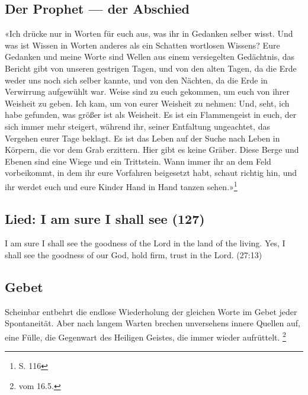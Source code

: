 \subsection{Der Prophet — der Abschied}
«Ich drücke nur in Worten für euch aus, was ihr in Gedanken selber wisst. Und was ist Wissen in Worten anderes als ein Schatten wortlosen Wissens? Eure Gedanken und meine Worte sind Wellen aus einem versiegelten Gedächtnis, das Bericht gibt von unseren gestrigen Tagen, und von den alten Tagen, da die Erde weder uns noch sich selber kannte, und von den Nächten, da die Erde in Verwirrung aufgewühlt war. Weise sind zu euch gekommen, um euch von ihrer Weisheit zu geben. Ich kam, um von eurer Weisheit zu nehmen: Und, seht, ich habe gefunden, was größer ist als Weisheit. Es ist ein Flammengeist in euch, der sich immer mehr steigert, während ihr, seiner Entfaltung ungeachtet, das Vergehen eurer Tage beklagt. Es ist das Leben auf der Suche nach Leben in Körpern, die vor dem Grab erzittern.
Hier gibt es keine Gräber. Diese Berge und Ebenen sind eine Wiege und ein Trittstein. Wann immer ihr an dem Feld vorbeikommt, in dem ihr eure Vorfahren beigesetzt habt, schaut richtig hin, und ihr werdet euch und eure Kinder Hand in Hand tanzen sehen.»\footnote{\cite{prophet}S. 116}

\subsection{Lied: I am sure I shall see (127)}
I am sure I shall see the goodness of the Lord in the land of the living. Yes, I shall see the goodness of our God, hold firm, trust in the Lord. 
(27:13)

\subsection{Gebet}
Scheinbar entbehrt die endlose Wiederholung der gleichen Worte im Gebet jeder Spontaneität. Aber nach langem Warten brechen unversehens innere Quellen auf, eine Fülle, die Gegenwart des Heiligen Geistes, die immer wieder aufrüttelt.
\footnote{\cite{FR-heute} vom 16.5.}

